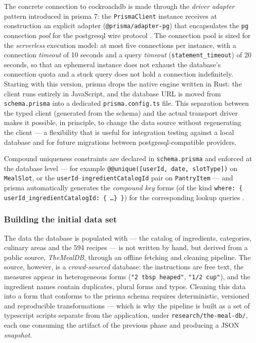 The concrete connection to \gls{cockroachdb} is made through the \textit{driver adapter} pattern introduced in \gls{prisma} 7: the \texttt{PrismaClient} instance receives at construction an explicit adapter (\texttt{@prisma/adapter-pg}) that encapsulates the \texttt{pg} connection \textit{pool} for the \gls{postgresql} wire protocol \cite{prisma_orm,cockroachdb}. The connection pool is sized for the \textit{serverless} execution model: at most five connections per instance, with a connection \textit{timeout} of 10 seconds and a query \textit{timeout} (\texttt{statement\_timeout}) of 20 seconds, so that an ephemeral instance does not exhaust the database's connection quota and a stuck query does not hold a connection indefinitely. Starting with this version, \gls{prisma} drops the native engine written in Rust: the client runs entirely in JavaScript, and the database URL is moved from \texttt{schema.prisma} into a dedicated \texttt{prisma.config.ts} file. This separation between the typed client (generated from the schema) and the actual transport driver makes it possible, in principle, to change the data source without regenerating the client --- a flexibility that is useful for integration testing against a local database and for future migrations between \gls{postgresql}-compatible providers.

Compound uniqueness constraints are declared in \texttt{schema.prisma} and enforced at the database level --- for example \texttt{@@unique([userId, date, slotType])} on \texttt{MealSlot}, or the \texttt{userId}--\texttt{ingredientCatalogId} pair on \texttt{PantryItem} --- and \gls{prisma} automatically generates the \textit{compound key} forms (of the kind \texttt{where: \{ userId\_ingredientCatalogId: \{ \ldots \} \}}) for the corresponding lookup queries \cite{prisma_orm}.

\subsubsection{Building the initial data set}\label{subsec:pipeline-date}

The data the database is populated with --- the catalog of ingredients, categories, culinary areas and the 594 recipes --- is not written by hand, but derived from a public source, \textit{TheMealDB}, through an offline fetching and cleaning pipeline. The source, however, is a \textit{crowd-sourced} database: the instructions are free text, the measures appear in heterogeneous forms (\texttt{"2 tbsp heaped"}, \texttt{"1/2 cup"}), and the ingredient names contain duplicates, plural forms and typos. Cleaning this data into a form that conforms to the \gls{prisma} schema requires deterministic, versioned and reproducible transformations --- which is why the pipeline is built as a set of \gls{typescript} scripts separate from the application, under \texttt{research/the-meal-db/}, each one consuming the artifact of the previous phase and producing a JSON \textit{snapshot}.

